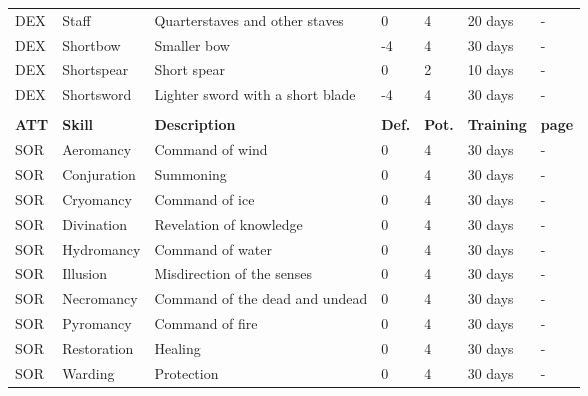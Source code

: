 \begin{center}
\begin{xltabular}{\textwidth}{l l X l l l l}
        DEX & Staff & Quarterstaves and other staves & 0 & 4 & 20 days & - \\
        DEX & Shortbow & Smaller bow & -4 & 4 & 30 days & - \\ %
        DEX & Shortspear & Short spear & 0 & 2 & 10 days & - \\
        DEX & Shortsword & Lighter sword with a short blade & -4 & 4 & 30 days & - \\
         \\*
        \textbf{ATT} & \textbf{Skill} & \textbf{Description} & \textbf{Def.} & \textbf{Pot.} & \textbf{Training} & \textbf{page} \\*
        SOR & Aeromancy & Command of wind & 0 & 4 & 30 days & - \\
        SOR & Conjuration & Summoning & 0 & 4 & 30 days & - \\
        SOR & Cryomancy & Command of ice & 0 & 4 & 30 days & - \\
        SOR & Divination & Revelation of knowledge & 0 & 4 & 30 days & - \\
        SOR & Hydromancy & Command of water & 0 & 4 & 30 days & - \\
        SOR & Illusion & Misdirection of the senses & 0 & 4 & 30 days & - \\
        SOR & Necromancy & Command of the dead and undead & 0 & 4 & 30 days & - \\
        SOR & Pyromancy & Command of fire & 0 & 4 & 30 days & - \\
        SOR & Restoration & Healing & 0 & 4 & 30 days & - \\
        SOR & Warding & Protection & 0 & 4 & 30 days & - \\
    \end{xltabular}
\end{center}


